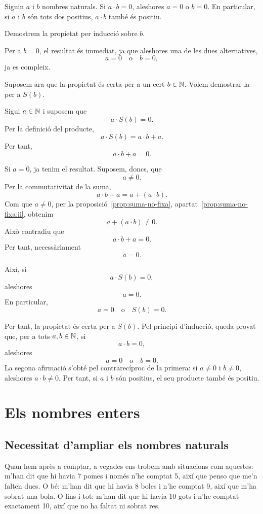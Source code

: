 \begin{proposicio}
Siguin $a$ i $b$ nombres naturals. Si $a\cdot b=0$, aleshores $a=0$ o $b=0$. En particular, si $a$ i $b$ són tots dos positius, $a\cdot b$ també és positiu.
\end{proposicio}

\begin{prova}
Demostrem la propietat per inducció sobre $b$.

Per a $b=0$, el resultat és immediat, ja que aleshores una de les dues alternatives,
\[
a=0 \quad \text{o} \quad b=0,
\]
ja es compleix.

Suposem ara que la propietat és certa per a un cert $b\in\mathbb{N}$. Volem demostrar-la per a $S(b)$.

Sigui $a\in\mathbb{N}$ i suposem que
\[
a\cdot S(b)=0.
\]
Per la definició del producte,
\[
a\cdot S(b)=a\cdot b+a.
\]
Per tant,
\[
a\cdot b+a=0.
\]

Si $a=0$, ja tenim el resultat. Suposem, doncs, que
\[
a\neq 0.
\]
Per la commutativitat de la suma,
\[
a\cdot b+a=a+(a\cdot b).
\]
Com que $a\neq 0$, per la proposició~\ref{prop:suma-no-fixa}, apartat~\ref{prop:suma-no-fixa:ii}, obtenim
\[
a+(a\cdot b)\neq 0.
\]
Això contradiu que
\[
a\cdot b+a=0.
\]
Per tant, necessàriament
\[
a=0.
\]

Així, si
\[
a\cdot S(b)=0,
\]
aleshores
\[
a=0.
\]
En particular,
\[
a=0 \quad \text{o} \quad S(b)=0.
\]

Per tant, la propietat és certa per a $S(b)$. Pel principi d'inducció, queda provat que, per a tots $a,b\in\mathbb{N}$, si
\[
a\cdot b=0,
\]
aleshores
\[
a=0 \quad \text{o} \quad b=0.
\]
La segona afirmació s'obté pel contrarecíproc de la primera: si $a\neq 0$ i $b\neq 0$, aleshores $a\cdot b\neq 0$. Per tant, si $a$ i $b$ són positius, el seu producte també és positiu.
\end{prova}

\section{Els nombres enters}

\subsection{Necessitat d'ampliar els nombres naturals}

Quan hem après a comptar, a vegades ens trobem amb situacions com aquestes: m'han dit que hi havia 7 pomes i només n'he comptat 5, així que penso que me'n falten dues. O bé: m'han dit que hi havia 8 boles i n'he comptat 9, així que m'ha sobrat una bola. O fins i tot: m'han dit que hi havia 10 gots i n'he comptat exactament 10, així que no ha faltat ni sobrat res.

